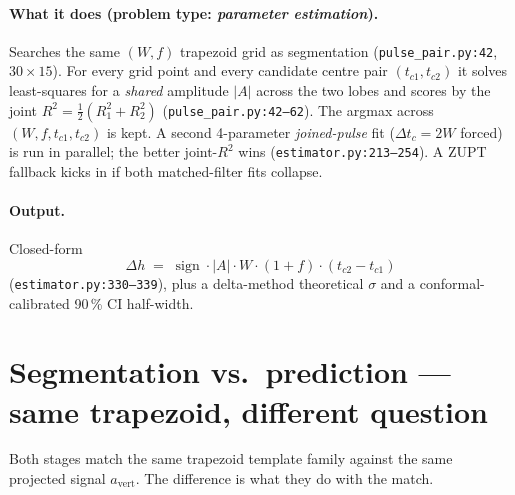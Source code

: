\documentclass[11pt,a4paper]{article}
\newcommand{\avert}{a_{\mathrm{vert}}}
\begin{document}
\paragraph{What it does (problem type: \emph{parameter estimation}).}
Searches the same $(W,f)$ trapezoid grid as segmentation
(\texttt{pulse\_pair.py:42}, $30\times 15$). For every grid point and
every candidate centre pair $(t_{c1}, t_{c2})$ it solves
least-squares for a \emph{shared} amplitude $|A|$ across the two
lobes and scores by the joint $R^2 = \tfrac12(R^2_1 + R^2_2)$
(\texttt{pulse\_pair.py:42--62}). The argmax across
$(W, f, t_{c1}, t_{c2})$ is kept. A second 4-parameter
\emph{joined-pulse} fit ($\Delta t_c = 2W$ forced) is run in parallel;
the better joint-$R^2$ wins (\texttt{estimator.py:213--254}). A ZUPT
fallback kicks in if both matched-filter fits collapse.

\paragraph{Output.}
Closed-form
\[
\Delta h \;=\; \operatorname{sign}\cdot |A|\cdot W\cdot (1+f)\cdot (t_{c2} - t_{c1})
\]
(\texttt{estimator.py:330--339}), plus a delta-method theoretical
$\sigma$ and a conformal-calibrated 90\,\% CI half-width.

\section{Segmentation vs.\ prediction --- same trapezoid, different question}

Both stages match the same trapezoid template family against the same
projected signal $\avert$. The difference is what they do with the
match.
\end{document}
